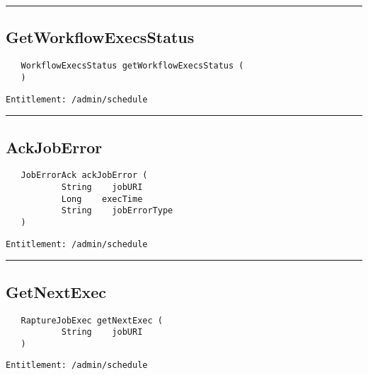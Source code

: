 \rule{12cm}{2pt}
\subsection{GetWorkflowExecsStatus}
\label{Api:GetWorkflowExecsStatus}
\begin{verbatim}
   WorkflowExecsStatus getWorkflowExecsStatus (
   )
\end{verbatim}
\begin{Verbatim}[fontsize=\small, formatcom=\color{Maroon}]
  Entitlement: /admin/schedule
\end{Verbatim}



\rule{12cm}{2pt}
\subsection{AckJobError}
\label{Api:AckJobError}
\begin{verbatim}
   JobErrorAck ackJobError (
           String    jobURI
           Long    execTime
           String    jobErrorType
   )
\end{verbatim}
\begin{Verbatim}[fontsize=\small, formatcom=\color{Maroon}]
  Entitlement: /admin/schedule
\end{Verbatim}



\rule{12cm}{2pt}
\subsection{GetNextExec}
\label{Api:GetNextExec}
\begin{verbatim}
   RaptureJobExec getNextExec (
           String    jobURI
   )
\end{verbatim}
\begin{Verbatim}[fontsize=\small, formatcom=\color{Maroon}]
  Entitlement: /admin/schedule
\end{Verbatim}



